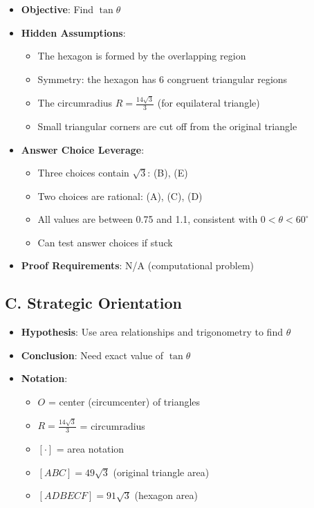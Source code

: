 \documentclass[12pt]{article}
\begin{document}
\begin{problemconfigbox}
\begin{itemize}[leftmargin=*]
    \item \textbf{Objective}: Find $\tan\theta$
    
    \item \textbf{Hidden Assumptions}: 
    \begin{itemize}
        \item The hexagon is formed by the overlapping region
        \item Symmetry: the hexagon has 6 congruent triangular regions
        \item The circumradius $R = \frac{14\sqrt{3}}{3}$ (for equilateral triangle)
        \item Small triangular corners are cut off from the original triangle
    \end{itemize}
    
    \item \textbf{Answer Choice Leverage}: 
    \begin{itemize}
        \item Three choices contain $\sqrt{3}$: (B), (E)
        \item Two choices are rational: (A), (C), (D)
        \item All values are between 0.75 and 1.1, consistent with $0 < \theta < 60^{\circ}$
        \item Can test answer choices if stuck
    \end{itemize}
    
    \item \textbf{Proof Requirements}: N/A (computational problem)
\end{itemize}

\subsection*{C. Strategic Orientation}
\begin{itemize}[leftmargin=*]
    \item \textbf{Hypothesis}: Use area relationships and trigonometry to find $\theta$
    
    \item \textbf{Conclusion}: Need exact value of $\tan\theta$
    
    \item \textbf{Notation}: 
    \begin{itemize}
        \item $O$ = center (circumcenter) of triangles
        \item $R = \frac{14\sqrt{3}}{3}$ = circumradius
        \item $[\cdot]$ = area notation
        \item $[ABC] = 49\sqrt{3}$ (original triangle area)
        \item $[ADBECF] = 91\sqrt{3}$ (hexagon area)
    \end{itemize}
    

\end{itemize}
\end{problemconfigbox}
\end{document}
